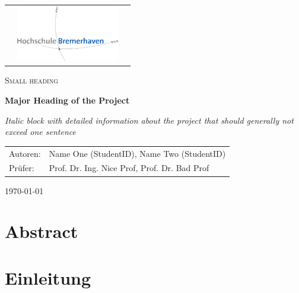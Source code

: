 \documentclass[12pt]{scrartcl}
\begin{document}
\begin{titlepage}
\begin{tabular}{lcr}
  \hspace{10cm} &
  \includegraphics[width=170px]{images/hb_logo_2c.jpg}
  \vspace{1cm}
\end{tabular}
	\centering	
	\vspace{1cm}
	{\scshape\Large Small heading \par}
	\vspace{1.5cm}
	{\huge\bfseries Major Heading of the Project\par}
    \vspace{2cm}
    {\Large\itshape 
        Italic block with detailed information about the project that should generally not exceed one sentence
        	\par}
	\vfill
	\begin{tabularx}{\textwidth}{lX}
		Autoren: & Name One (StudentID), Name Two (StudentID) \\
		Prüfer: & Prof. Dr. Ing. Nice Prof, Prof. Dr. Bad Prof  \\
		        
	\end{tabularx}  
    \vfill

	{\large \today \par}       
\end{titlepage}
\restoregeometry
\section*{Abstract}

\pagebreak

\tableofcontents
\pagebreak

\listoffigures
\pagebreak
\noindent


\section{Einleitung} \label{sec:einleitung}

\end{document}
